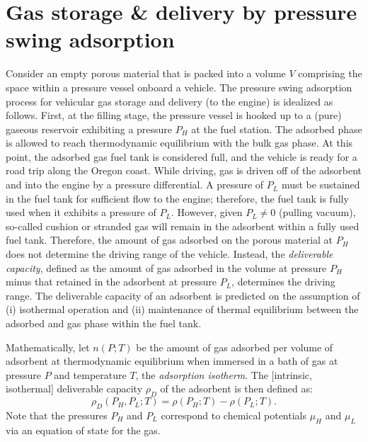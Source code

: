 \documentclass{nature}
\begin{document}
\section{Gas storage \& delivery by pressure swing adsorption}
Consider an empty porous material that is packed into a volume $V$ comprising the space within a pressure vessel onboard a vehicle. The pressure swing adsorption process \cite{sircar2002pressure} for vehicular gas storage and delivery (to the engine) is idealized as follows. First, at the filling stage, the pressure vessel is hooked up to a (pure) gaseous reservoir exhibiting a pressure $P_{H}$ at the fuel station. The adsorbed phase is allowed to reach thermodynamic equilibrium with the bulk gas phase. At this point, the adsorbed gas fuel tank is considered full, and the vehicle is ready for a road trip along the Oregon coast. While driving, gas is driven off of the adsorbent and into the engine by a pressure differential. A pressure of $P_{L}$ must be sustained in the fuel tank for sufficient flow to the engine; therefore, the fuel tank is fully used when it exhibits a pressure of $P_{L}$. However, given $P_{L} \neq 0$ (pulling vacuum), so-called cushion or stranded gas will remain in the adsorbent within a fully used fuel tank. Therefore, the amount of gas adsorbed on the porous material at $P_H$ does not determine the driving range of the vehicle. Instead, the \emph{deliverable capacity}, defined as the amount of gas adsorbed in the volume at pressure $P_H$ minus that retained in the adsorbent at pressure $P_L$, determines the driving range. The deliverable capacity of an adsorbent is predicted on the assumption of (i) isothermal operation and (ii) maintenance of thermal equilibrium between the adsorbed and gas phase within the fuel tank.

Mathematically, let $n(P; T)$ be the amount of gas adsorbed per volume of adsorbent at thermodynamic equilibrium when immersed in a bath of gas at pressure $P$ and temperature $T$, the \emph{adsorption isotherm}. The [intrinsic, isothermal] deliverable capacity $\rho_D$ of the adsorbent is then defined as:
\begin{equation}
    \rho_D(P_H, P_L; T) = \rho(P_H; T) - \rho(P_L; T).
    \label{eq:delcap}
\end{equation}
Note that the pressures $P_H$ and $P_L$ correspond to chemical potentials $\mu_H$ and $\mu_L$ via an equation of state for the gas.
\end{document}
